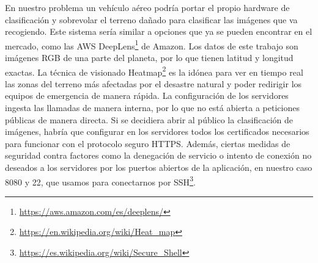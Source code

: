 En nuestro problema un vehículo aéreo podría portar el propio hardware de clasificación y sobrevolar el terreno dañado para clasificar las imágenes que va recogiendo.
Este sistema sería similar a opciones que ya se pueden encontrar en el mercado, como las AWS DeepLens\footnote{\url{https://aws.amazon.com/es/deeplens/}} de Amazon.
Los datos de este trabajo son imágenes RGB de una parte del planeta, por lo que tienen latitud y longitud exactas.
La técnica de visionado Heatmap\footnote{\url{https://en.wikipedia.org/wiki/Heat\_map}} es la idónea para ver en tiempo real las zonas del terreno más afectadas por el desastre natural y poder redirigir los equipos de emergencia de manera rápida.
La configuración de los servidores ingesta las llamadas de manera interna, por lo que no está abierta a peticiones públicas de manera directa.
Si se decidiera abrir al público la clasificación de imágenes, habría que configurar en los servidores todos los certificados necesarios para funcionar con el protocolo seguro HTTPS. Además, ciertas medidas de seguridad contra factores como la denegación de servicio o intento de conexión no deseados a los servidores por los puertos abiertos de la aplicación, en nuestro caso 8080 y 22, que usamos para conectarnos por SSH\footnote{\url{https://es.wikipedia.org/wiki/Secure\_Shell}}.